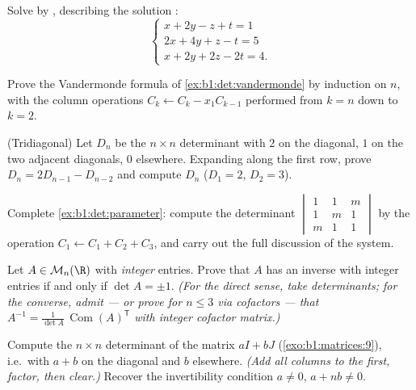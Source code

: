 \begin{exercise}[$\star$]\label{exo:b1:det:4}
Solve by , describing the solution :
\[
\begin{cases}
x + 2y - z + t = 1\\
2x + 4y + z - t = 5\\
x + 2y + 2z - 2t = 4 .
\end{cases}
\]
\end{exercise}

\begin{exercise}[$\star\star$]\label{exo:b1:det:5}
Prove the Vandermonde formula of \cref{ex:b1:det:vandermonde} by
induction on $n$, with the column operations $C_k \leftarrow C_k -
x_1 C_{k-1}$ performed from $k = n$ down to $k = 2$.
\end{exercise}

\begin{exercise}[$\star\star$]\label{exo:b1:det:6}
(Tridiagonal) Let $D_n$ be the $n \times n$ determinant with $2$ on
the diagonal, $1$ on the two adjacent diagonals, $0$ elsewhere.
Expanding along the first row, prove $D_n = 2D_{n-1} - D_{n-2}$ and
compute $D_n$ ($D_1 = 2$, $D_2 = 3$).
\end{exercise}

\begin{exercise}[$\star\star$]\label{exo:b1:det:7}
Complete \cref{ex:b1:det:parameter}: compute the determinant
$\begin{vmatrix} 1 & 1 & m\\ 1 & m & 1\\ m & 1 & 1\end{vmatrix}$
by the operation $C_1 \leftarrow C_1 + C_2 + C_3$, and carry out the
full discussion of the system.
\end{exercise}

\begin{exercise}[$\star\star$]\label{exo:b1:det:8}
Let $A \in \mathcal{M}_n(\R)$ with \emph{integer} entries. Prove
that $A$ has an inverse with integer entries if and only if $\det A
= \pm 1$. \emph{(For the direct sense, take determinants; for the
converse, admit --- or prove for $n \leq 3$ via cofactors --- that
$A^{-1} = \frac{1}{\det A}\,\operatorname{Com}(A)^{\mathsf T}$ with
integer cofactor matrix.)}
\end{exercise}

\begin{exercise}[$\star\star\star$]\label{exo:b1:det:9}
Compute the $n \times n$ determinant of the matrix $aI + bJ$
(\cref{exo:b1:matrices:9}), i.e.\ with $a + b$ on the diagonal and
$b$ elsewhere. \emph{(Add all columns to the first, factor, then
clear.)} Recover the invertibility condition $a \neq 0$, $a + nb
\neq 0$.
\end{exercise}

